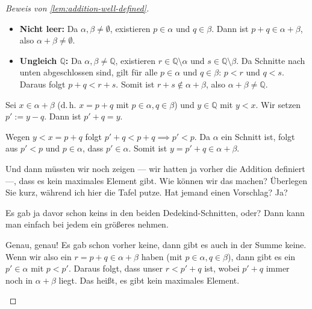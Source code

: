 \begin{proof}[Beweis von \cref{lem:addition-well-defined}]
\begin{math-stroke}
\begin{itemize}
    \item \textbf{Nicht leer:} Da $\alpha, \beta \neq \emptyset$, existieren $p \in \alpha$ und $q \in \beta$. Dann ist $p + q \in \alpha + \beta$, also $\alpha + \beta \neq \emptyset$.
    \item \textbf{Ungleich $\mathbb{Q}$:} Da $\alpha, \beta \neq \mathbb{Q}$, existieren $r \in \mathbb{Q} \setminus \alpha$ und $s \in \mathbb{Q} \setminus \beta$. Da Schnitte nach unten abgeschlossen sind, gilt für alle $p \in \alpha$ und $q \in \beta$: $p < r$ und $q < s$. Daraus folgt $p + q < r + s$. Somit ist $r + s \notin \alpha + \beta$, also $\alpha + \beta \neq \mathbb{Q}$.
\end{itemize}
\end{math-stroke}

\begin{math-stroke}
Sei $x \in \alpha + \beta$ (d.\,h. $x = p + q$ mit $p \in \alpha, q \in \beta$) und $y \in \mathbb{Q}$ mit $y < x$. Wir setzen $p' := y - q$. Dann ist $p' + q = y$.

Wegen $y < x = p + q$ folgt $p' + q < p + q \implies p' < p$. Da $\alpha$ ein Schnitt ist, folgt aus $p' < p$ und $p \in \alpha$, dass $p' \in \alpha$. Somit ist $y = p' + q \in \alpha + \beta$.
\end{math-stroke}

\begin{spoken-clean}[00:55:30 - 00:56:15]
Und dann müssten wir noch zeigen --- wir hatten ja vorher die Addition definiert ---, dass es kein maximales Element gibt. Wie können wir das machen? Überlegen Sie kurz, während ich hier die Tafel putze. Hat jemand einen Vorschlag? Ja?
\end{spoken-clean}

\begin{student-interaction}
Es gab ja davor schon keins in den beiden Dedekind-Schnitten, oder? Dann kann man einfach bei jedem ein größeres nehmen.
\end{student-interaction}

\begin{spoken-clean}[00:56:15 - 00:57:15]
Genau, genau! Es gab schon vorher keine, dann gibt es auch in der Summe keine. Wenn wir also ein $r = p + q \in \alpha + \beta$ haben (mit $p \in \alpha, q \in \beta$), dann gibt es ein $p' \in \alpha$ mit $p < p'$. Daraus folgt, dass unser $r < p' + q$ ist, wobei $p' + q$ immer noch in $\alpha + \beta$ liegt. Das heißt, es gibt kein maximales Element.
\end{spoken-clean}


\end{proof}
